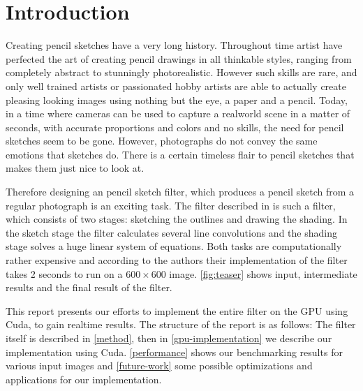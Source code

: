 \section{Introduction}
Creating pencil sketches have a very long history. Throughout time artist have
perfected the art of creating pencil drawings in all thinkable styles, ranging
from completely abstract to stunningly photorealistic. However such skills are
rare, and only well trained artists or passionated hobby artists are able to
actually create pleasing looking images using nothing but the eye, a paper and a
pencil. Today, in a time where cameras can be used to capture a realworld scene
in a matter of seconds, with accurate proportions and colors and no skills, the
need for pencil sketches seem to be gone.  However, photographs do not convey
the same emotions that sketches do. There is a certain timeless flair to pencil
sketches that makes them just nice to look at.

Therefore designing an pencil sketch filter, which produces a pencil sketch from
a regular photograph is an exciting task. The filter described in
\cite{mainPaper} is such a filter, which consists of two stages: sketching the
outlines and drawing the shading. In the sketch stage the filter calculates several
line convolutions and the shading stage solves a huge linear system of
equations. Both tasks are computationally rather expensive and according to the
authors their implementation of the filter takes 2 seconds to run on a
$600\times 600$ image. \autoref{fig:teaser} shows input, intermediate
results and the final result of the filter.

This report presents our efforts to implement the entire filter on the GPU using
Cuda, to gain realtime results. The structure of the report is as follows: The
filter itself is described in \autoref{method}, then in
\autoref{gpu-implementation} we describe our implementation using Cuda.
\autoref{performance} shows our benchmarking results for various input images
and \autoref{future-work} some possible optimizations and applications for our
implementation.
